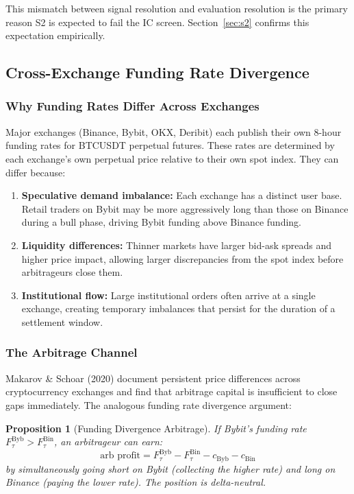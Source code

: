 \documentclass[12pt, a4paper]{article}
\theoremstyle{plain}
\newtheorem{proposition}{Proposition}[section]
\theoremstyle{definition}
\begin{document}
This mismatch between signal resolution and evaluation resolution is
the primary reason S2 is expected to fail the IC screen.
Section~\ref{sec:s2} confirms this expectation empirically.

\subsection{Cross-Exchange Funding Rate Divergence}
\label{sec:funding_div_theory}

\subsubsection{Why Funding Rates Differ Across Exchanges}

Major exchanges (Binance, Bybit, OKX, Deribit) each publish their own
8-hour funding rates for BTCUSDT perpetual futures.  These rates are
determined by each exchange's own perpetual price relative to their own
spot index.  They can differ because:

\begin{enumerate}
  \item \textbf{Speculative demand imbalance:}  Each exchange has a
        distinct user base.  Retail traders on Bybit may be more
        aggressively long than those on Binance during a bull phase,
        driving Bybit funding above Binance funding.
  \item \textbf{Liquidity differences:}  Thinner markets have larger
        bid-ask spreads and higher price impact, allowing larger
        discrepancies from the spot index before arbitrageurs close them.
  \item \textbf{Institutional flow:}  Large institutional orders often
        arrive at a single exchange, creating temporary imbalances that
        persist for the duration of a settlement window.
\end{enumerate}

\subsubsection{The Arbitrage Channel}

Makarov \& Schoar (2020) document persistent price differences across
cryptocurrency exchanges and find that arbitrage capital is insufficient
to close gaps immediately.  The analogous funding rate divergence
argument:

\begin{proposition}[Funding Divergence Arbitrage]
  If Bybit's funding rate $F^{\mathrm{Byb}}_\tau > F^{\mathrm{Bin}}_\tau$,
  an arbitrageur can earn:
  \[
    \text{arb profit} = F^{\mathrm{Byb}}_\tau - F^{\mathrm{Bin}}_\tau
                        - c_{\mathrm{Byb}} - c_{\mathrm{Bin}}
  \]
  by simultaneously going short on Bybit (collecting the higher rate)
  and long on Binance (paying the lower rate).  The position is
  delta-neutral.
\end{proposition}
\end{document}

